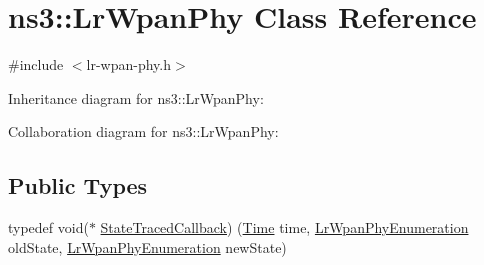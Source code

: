 \hypertarget{classns3_1_1LrWpanPhy}{}\section{ns3\+:\+:Lr\+Wpan\+Phy Class Reference}
\label{classns3_1_1LrWpanPhy}


{\ttfamily \#include $<$lr-\/wpan-\/phy.\+h$>$}



Inheritance diagram for ns3\+:\+:Lr\+Wpan\+Phy\+:


Collaboration diagram for ns3\+:\+:Lr\+Wpan\+Phy\+:
\subsection*{Public Types}
\begin{DoxyCompactItemize}
\item 
typedef void($\ast$ \hyperlink{classns3_1_1LrWpanPhy_aea965ae9baca8ac61deab4594b50384a}{State\+Traced\+Callback}) (\hyperlink{classns3_1_1Time}{Time} time, \hyperlink{group__lr-wpan_ga6494269d13d45c511a07b7ccbb1de754}{Lr\+Wpan\+Phy\+Enumeration} old\+State, \hyperlink{group__lr-wpan_ga6494269d13d45c511a07b7ccbb1de754}{Lr\+Wpan\+Phy\+Enumeration} new\+State)
\end{DoxyCompactItemize}
